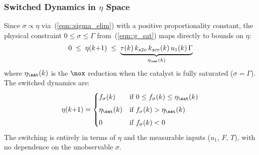 \subsubsection{Switched Dynamics in $\eta$ Space}
Since $\sigma \propto \eta$ via~(\ref{eqn::sigma_elim}) with a positive proportionality constant, the physical
constraint $0 \leq \sigma \leq \Gamma$ from~(\ref{eqn::g_sat}) maps directly to bounds on $\eta$:
\begin{align}
    0 \;\leq\; \eta(k{+}1) \;\leq\;
        \underbrace{\tau(k)\, k_{s2v}\, k_{scr}(k)\, u_1(k)\, \Gamma}_{\eta_{\sat}(k)}
    \label{eqn::eta_bounds}
\end{align}
where $\eta_{\sat}(k)$ is the $\nox$ reduction when the catalyst is fully saturated ($\sigma = \Gamma$). The switched
dynamics are:
\begin{align}
    \eta(k{+}1) = \begin{cases}
        f_\sigma(k)       & \text{if } 0 \leq f_\sigma(k) \leq \eta_{\sat}(k) \\[4pt]
        \eta_{\sat}(k)    & \text{if } f_\sigma(k) > \eta_{\sat}(k) \\[4pt]
        0                 & \text{if } f_\sigma(k) < 0
    \end{cases}
    \label{eqn::eta_switched}
\end{align}
The switching is entirely in terms of $\eta$ and the measurable inputs ($u_1$, $F$, $T$), with no dependence on the
unobservable $\sigma$.
